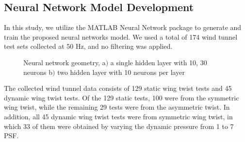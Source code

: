\documentclass[11pt]{ucthesis}
\begin{document}
\subsection{Neural Network Model Development}
\label{sec:NN}

In this study, we utilize the MATLAB Neural Network package to generate and train the proposed neural networks model. We used a total of 174 wind tunnel test sets collected at 50 Hz, and no filtering was applied. 

\begin{figure}[thpb]
\centering
{} 
\caption{Neural network geometry, a$)$ a single hidden layer with 10, 30 neurons b$)$ two hidden layer with 10 neurons per layer}
\label{fig:NNconfig}
\end{figure}

The collected wind tunnel data consists of 129 static wing twist tests and 45 dynamic wing twist tests. Of the 129 static tests, 100 were from the symmetric wing twist, while the remaining 29 tests were from the asymmetric twist. In addition, all 45 dynamic wing twist tests were from symmetric wing twist, in which 33 of them were obtained by varying the dynamic pressure from 1 to 7 PSF. 
\end{document}
